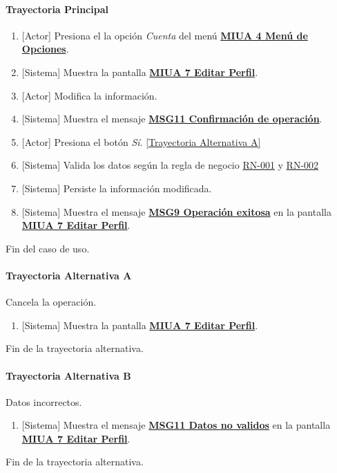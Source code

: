 \paragraph{Trayectoria Principal}
	\begin{enumerate}
	    \item {[Actor]} Presiona el la opción \textit{Cuenta} del menú \hyperref[fig:MIUA-4]{\bf MIUA 4 Menú de Opciones}.
	    \item {[Sistema]} Muestra la pantalla  \hyperref[fig:MIUA-7]{\bf MIUA 7 Editar Perfil}.
	    \item {[Actor]} Modifica la información.
	    \item {[Sistema]} Muestra el mensaje \hyperref[MSG11]{\bf MSG11 Confirmación de operación}.
	    \item {[Actor]} Presiona el botón \textit{Sí}. \hyperref[A-USR-CU4:TA]{[Trayectoria Alternativa A]}
	    \item {[Sistema]} Valida los datos según la regla de negocio \hyperref[RN001]{RN-001} y \hyperref[RN002]{RN-002}
	    \item {[Sistema]} Persiste la información modificada. 
	    \item {[Sistema]} Muestra el mensaje \hyperref[MSG9]{\bf MSG9 Operación exitosa} en la pantalla \hyperref[fig:MIUA-7]{\bf MIUA 7 Editar Perfil}.
	\end{enumerate}
	Fin del caso de uso.

\paragraph{Trayectoria Alternativa A} \label{A-USR-CU4:TA}
	Cancela la operación.
	\begin{enumerate}[label=A\arabic*.]
		\item {[Sistema]} Muestra la pantalla \hyperref[fig:MIUA-7]{\bf MIUA 7 Editar Perfil}.
	\end{enumerate}
	Fin de la trayectoria alternativa.

\paragraph{Trayectoria Alternativa B} \label{A-USR-CU4:TB}
	Datos incorrectos.
	\begin{enumerate}[label=B\arabic*.]
		\item {[Sistema]} Muestra el mensaje \hyperref[MSG1]{\bf MSG11 Datos no validos} en la pantalla \hyperref[fig:MIUA-7]{\bf MIUA 7 Editar Perfil}.
	\end{enumerate}
	Fin de la trayectoria alternativa.